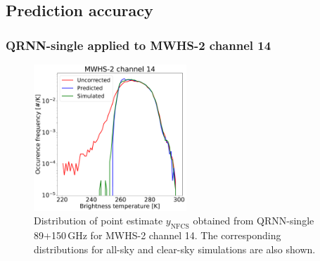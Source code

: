 \documentclass[amt, manuscript]{copernicus}
\newcommand{\ynfcs}{y_\text{NFCS}}
\begin{document}
\subsection{Prediction accuracy}

\subsubsection{QRNN-single applied to MWHS-2 channel 14} 
\begin{figure}[t]
	\centering
	\includegraphics[height=55mm]{Figures/QRNN_output_mwhs.pdf} 
	\caption{Distribution of point estimate $\ynfcs$ obtained from QRNN-single 89+150\,GHz for MWHS-2 channel 14. The corresponding distributions for all-sky and clear-sky simulations are also shown.}
	\label{fig:distribution_predicted_mwhs14}	
\end{figure}
\end{document}
